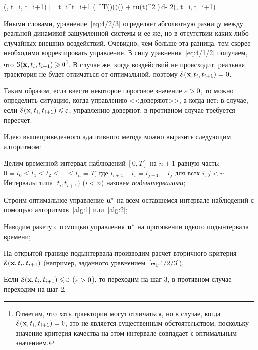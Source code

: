     \funcS(, t_i, t_{i+1}) \eqdef \Biggl| \int\limits_{t_i}^{t_{i+1}} \bigl( ^T(\tau)(\tau)(\tau) + ru(t)^2 \bigr)\,d\tau - 2\optF(, t_i, t_{i+1}) \Biggr| 
\eeq

Иными словами, уравнение~\ref{eq:4/2/3} определяет абсолютную разницу между реальной динамикой зашумленной системы и ее же, но в отсутствии каких-либо случайных внешних воздействий. Очевидно, чем больше эта разница, тем скорее необходимо корректировать управление. В силу уравнения~\vref{eq:4/1/2} получаем, что $\mathcal{S}(\mathbf{x}, t_i, t_{i+1}) \geqslant 0$\footnote{Отметим, что хоть траектории могут отличаться, но в случае, когда $\mathcal{S}(\mathbf{x}, t_i, t_{i+1}) = 0$, это не является существенным обстоятельством, поскольку значение критерия качества на этом интервале совпадает с оптимальным значением.}. В случае же, когда воздействий не происходит, реальная траектория не будет отличаться от оптимальной, поэтому $\mathcal{S}(\mathbf{x}, t_i, t_{i+1}) = 0$.

Таким образом, если ввести некоторое пороговое значение $\varepsilon > 0$, то можно определить ситуацию, когда управлению <<доверяют>>, а когда нет: в случае, если $\mathcal{S}(\mathbf{x}, t_i, t_{i+1}) \leqslant \varepsilon$, управлению доверяют, в противном случае требуется пересчет.

Идею вышеприведенного адаптивного метода можно выразить следующим алгоритмом:

    \benum
        \item
            Делим временной интервал наблюдений $[0, T]$ на $n+1$ равную часть: $0 = t_0 \leqslant t_1 \leqslant t_2 \leqslant \ldots \leqslant t_{n} = T$, где $t_{i+1}-t_i = t_{j+1}-t_j$ для всех $i, j < n$. Интервалы типа $[t_i, t_{i+1})$ ($i<n$) назовем \emph{подынтервалами};

        \item
            Строим оптимальное управление $\mathbf{u}^{*}$ на всем оставшемся интервале наблюдений с помощью алгоритмов~\ref{alg:1} или~\vref{alg:2};

        \item
            Наводим ракету с помощью управления $\mathbf{u}^{*}$ на протяжении одного подынтервала времени;

        \item
            На открытой границе подынтервала производим расчет вторичного критерия $\mathcal{S}(\mathbf{x}, t_i, t_{i+1})$ (например, заданного уравнением~\ref{eq:4/2/3});

        \item
            Если $\mathcal{S}(\mathbf{x}, t_i, t_{i+1}) \leqslant \varepsilon$ ($\varepsilon > 0$), то переходим на шаг 3, в противном случае переходим на шаг 2.

